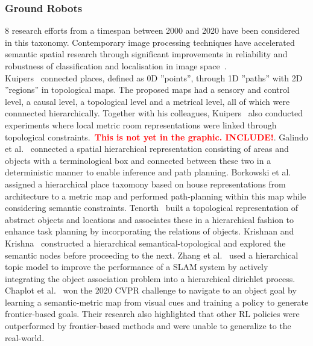 \documentclass[twocolumn,letterpaper]{IEEEAerospaceCLS}  %
\newcommand\todo[1]{\textbf{\textcolor{red}{#1}}}
\begin{document}
\subsubsection{Ground Robots} \label{sssec:ResLitCont}
$8$ research efforts from a timespan between 2000 and 2020 have been considered in this taxonomy. Contemporary image processing techniques have accelerated semantic spatial research through significant improvements in reliability and robustness of classification and localisation in image space~\cite{alom_history_2018}.\\
Kuipers~\cite{kuipers_spatial_2000} connected places, defined as 0D ''points'', through 1D ''paths'' with 2D ''regions'' in topological maps. The proposed maps had a sensory and control level, a causal level, a topological level and a metrical level, all of which were connnected hierarchically. Together with his colleagues, Kuipers~\cite{kuipers_local_2004} also conducted experiments where local metric room representations were linked through topological constraints.~\todo{This is not yet in the graphic. INCLUDE!}. Galindo et al.~\cite{galindo_robot_2008} connected a spatial hierarchical representation consisting of areas and objects with a terminological box and connected between these two in a deterministic manner to enable inference and path planning. Borkowski et al.~\cite{borkowski_towards_2010} assigned a hierarchical place taxomony based on house representations from architecture to a metric map and performed path-planning within this map while considering semantic constraints. Tenorth~\cite{tenorth_knowrob-map_2010} built a topological representation of abstract objects and locations and associates these in a hierarchical fashion to enhance task planning by incorporating the relations of objects. Krishnan and Krishna~\cite{krishnan_visual_2010} constructed a hierarchical semantical-topological and explored the semantic nodes before proceeding to the next. Zhang et al.~\cite{zhang_hierarchical_2019} used a hierarchical topic model to improve the performance of a SLAM system by actively integrating the object association problem into a hierarchical dirichlet process.\\
Chaplot et al.~\cite{chaplot_object_2020} won the 2020 CVPR challenge to navigate to an object goal by learning a semantic-metric map from visual cues and training a policy to generate frontier-based goals. Their research also highlighted that other RL policies were outperformed by frontier-based methods and were unable to generalize to the real-world.\\
\end{document}
